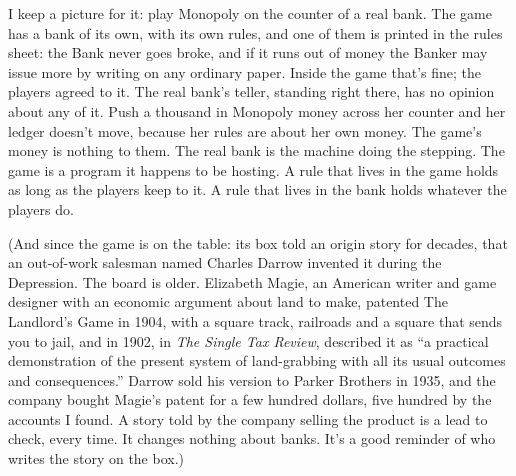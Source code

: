 \documentclass[11pt,twoside]{article}
\theoremstyle{thielethm}
\theoremstyle{thieledef}
\theoremstyle{thieledef}
\theoremstyle{thieledef}
\theoremstyle{thielethm}
\theoremstyle{thieleobs}
\theoremstyle{thielethm}
\begin{document}
I keep a picture for it: play Monopoly on the counter of a real bank. The game has a
bank of its own, with its own rules, and one of them is printed in the rules sheet: the Bank
never goes broke, and if it runs out of money the Banker may issue more by writing on any
ordinary paper. Inside the game that's fine; the players agreed to it. The real bank's teller,
standing right there, has no opinion about any of it. Push a thousand in Monopoly money across
her counter and her ledger doesn't move, because her rules are about her own money. The game's
money is nothing to them. The real bank is the machine doing the stepping. The game is a program it happens to be
hosting. A rule that lives in the game holds as long as the players keep to it. A rule that
lives in the bank holds whatever the players do.

(And since the game is on the table: its box told an origin story for decades, that an
out-of-work salesman named Charles Darrow invented it during the Depression. The board is
older. Elizabeth Magie, an American writer and game designer with an economic argument about
land to make, patented The Landlord's Game in 1904, with a square track, railroads and
a square that sends you to jail, and in 1902, in \emph{The Single Tax Review}, described it as ``a practical demonstration of the present
system of land-grabbing with all its usual outcomes and consequences.'' Darrow sold his version to
Parker Brothers in 1935, and the company bought
Magie's patent for a few hundred dollars, five hundred by the accounts I found. A story told by the company selling the product is a
lead to check, every time. It changes nothing about banks. It's a good reminder of who writes
the story on the box.)
\end{document}
